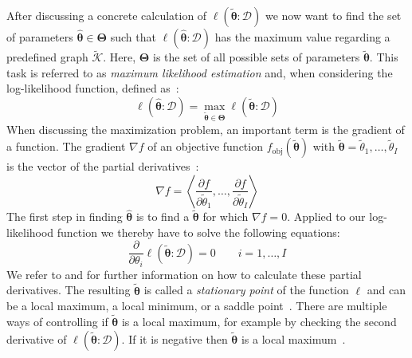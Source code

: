 After discussing a concrete calculation of $\ell(\mathbf{\tilde{\theta}}:\mathcal{D})$ we now want to find the set of parameters $\mathbf{\hat{\theta}}\in\mathbf{\Theta}$ such that $\ell(\mathbf{\hat{\theta}}:\mathcal{D})$ has the maximum value regarding a predefined graph $\mathcal{\tilde{K}}$.
Here, $\mathbf{\Theta}$ is the set of all possible sets of parameters $\mathbf{\tilde{\theta}}$.
This task is referred to as \textit{maximum likelihood estimation} and, when considering the log-likelihood function, defined as~\citep{koller2009probabilistic}:
\begin{equation}
  \label{equ:maximum-log-likelihood-estimation}
  \ell\left(\mathbf{\hat{\theta}}:\mathcal{D}\right)=\max_{\mathbf{\tilde{\theta}}\in\mathbf{\Theta}}\ell\left(\mathbf{\tilde{\theta}}:\mathcal{D}\right)
\end{equation}
When discussing the maximization problem, an important term is the \gls{gradient} of a \gls{function}.
The \gls{gradient} $\nabla f$ of an objective function $f_{\text{obj}}(\mathbf{\tilde{\theta}})$ with $\mathbf{\tilde{\theta}}=\tilde{\theta}_1,\dots,\tilde{\theta}_I$ is the vector of the partial derivatives~\citep{koller2009probabilistic}:
\begin{equation}
  \label{equ:gradient}
  \nabla f=\left\langle\frac{\partial f}{\partial\tilde{\theta}_1},\dots,\frac{\partial f}{\partial\tilde{\theta}_I}\right\rangle
\end{equation}
The first step in finding $\mathbf{\hat{\theta}}$ is to find a $\mathbf{\tilde{\theta}}$ for which $\nabla f=0$.
Applied to our log-likelihood function we thereby have to solve the following equations:
\begin{equation}
  \label{equ:log-likelihood-gradient}
  \frac{\partial}{\partial\theta_i}\ell\left(\mathbf{\tilde{\theta}}:\mathcal{D}\right)=0\ \ \ \ \ \ \ \ \ i=1,\dots,I
\end{equation}
We refer to \citet{sutton2010introduction} and \citet{koller2009probabilistic} for further information on how to calculate these partial derivatives.
The resulting $\mathbf{\tilde{\theta}}$ is called a \textit{stationary point} of the function $\ell$ and can be a local maximum, a local minimum, or a saddle point~\citep{koller2009probabilistic}.
There are multiple ways of controlling if $\mathbf{\tilde{\theta}}$ is a local maximum, for example by checking the second derivative of $\ell(\mathbf{\tilde{\theta}}:\mathcal{D})$.
If it is negative then $\mathbf{\tilde{\theta}}$ is a local maximum~\citep{koller2009probabilistic}.

